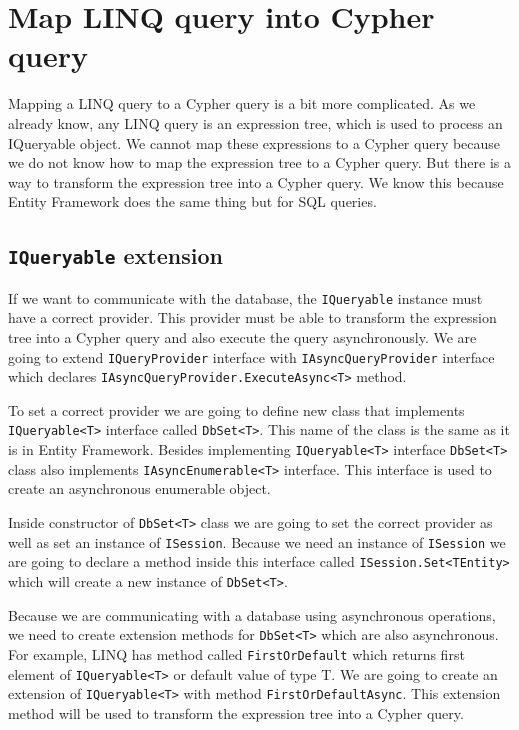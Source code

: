\section {Map LINQ query into Cypher query}

Mapping a LINQ query to a Cypher query is a bit more complicated. As we already know, any LINQ query is an expression tree, which is used to process an IQueryable object.
We cannot map these expressions to a Cypher query because we do not know how to map the expression tree to a Cypher query. But there is a way to transform the expression tree
into a Cypher query. We know this because Entity Framework does the same thing but for SQL queries.

\subsection{\texttt{IQueryable} extension}

If we want to communicate with the database, the \texttt{IQueryable} instance must have a correct provider.
This provider must be able to transform the expression tree into a Cypher query and also execute the query asynchronously. We are going to extend \texttt{IQueryProvider} interface
with \texttt{IAsyncQueryProvider} interface which declares \texttt{IAsyncQueryProvider.ExecuteAsync<T>} method.

To set a correct provider we are going to define new class that implements \texttt{IQueryable<T>} interface called \texttt{DbSet<T>}.
This name of the class is the same as it is in Entity Framework. Besides implementing \texttt{IQueryable<T>} interface \texttt{DbSet<T>} class also implements
\texttt{IAsyncEnumerable<T>} interface. This interface is used to create an asynchronous enumerable object.

Inside constructor of \texttt{DbSet<T>} class we are going to set the correct provider as well as set an instance of \texttt{ISession}.
Because we need an instance of \texttt{ISession} we are going to declare a method inside this interface called\linebreak
\texttt{ISession.Set<TEntity>} which will create a new instance
of \texttt{DbSet<T>}.

Because we are communicating with a database using asynchronous operations, we need to create extension methods for \texttt{DbSet<T>} which are also asynchronous.
For example, LINQ has method called \texttt{FirstOrDefault} which returns first element of \texttt{IQueryable<T>} or default value of type T. We are going to create
an extension of \texttt{IQueryable<T>} with method \texttt{FirstOrDefaultAsync}. This extension method will be used to transform the expression tree into a Cypher query.

